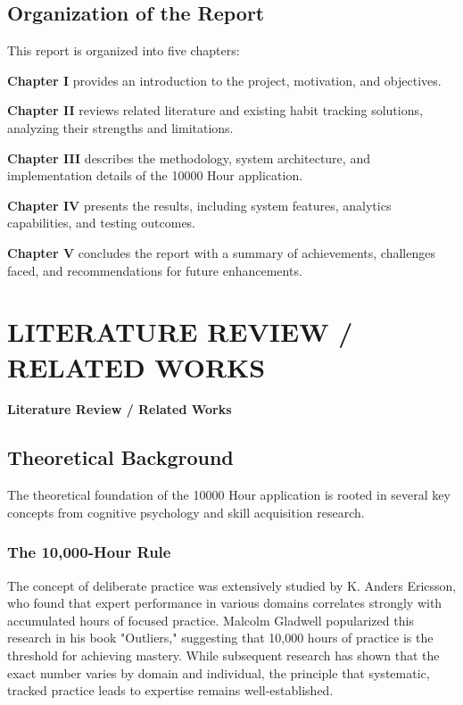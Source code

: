 \documentclass[12pt,a4paper]{report}
\newcommand{\JustifiedNormal}{\fontsize{12}{14}\selectfont\justifying\setlength{\parindent}{0pt}}
\begin{document}
\section{Organization of the Report}
\JustifiedNormal
This report is organized into five chapters:

\textbf{Chapter I} provides an introduction to the project, motivation, and objectives.

\textbf{Chapter II} reviews related literature and existing habit tracking solutions, analyzing their strengths and limitations.

\textbf{Chapter III} describes the methodology, system architecture, and implementation details of the 10000 Hour application.

\textbf{Chapter IV} presents the results, including system features, analytics capabilities, and testing outcomes.

\textbf{Chapter V} concludes the report with a summary of achievements, challenges faced, and recommendations for future enhancements.

\clearpage

\chapter{LITERATURE REVIEW / RELATED WORKS}
\begin{center}
  {\fontsize{14}{17}\selectfont\bfseries Literature Review / Related Works}
\end{center}
\vspace{1em}

\section{Theoretical Background}
\JustifiedNormal
The theoretical foundation of the 10000 Hour application is rooted in several key concepts from cognitive psychology and skill acquisition research.

\subsection{The 10,000-Hour Rule}
\JustifiedNormal
The concept of deliberate practice was extensively studied by K. Anders Ericsson, who found that expert performance in various domains correlates strongly with accumulated hours of focused practice. Malcolm Gladwell popularized this research in his book "Outliers," suggesting that 10,000 hours of practice is the threshold for achieving mastery. While subsequent research has shown that the exact number varies by domain and individual, the principle that systematic, tracked practice leads to expertise remains well-established.
\end{document}
